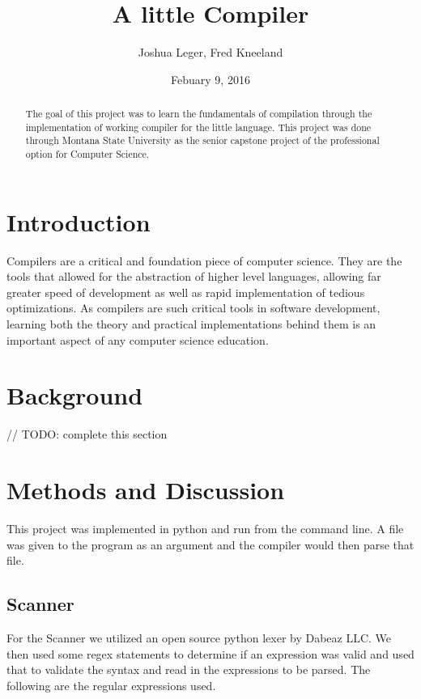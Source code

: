 \documentclass[12pt]{article}
\title{A little Compiler}
\author{Joshua Leger, Fred Kneeland}
\date{Febuary 9, 2016}
\begin{document}
    \maketitle
    \begin{abstract}
	
		The goal of this project was to learn the fundamentals of compilation through the implementation of working compiler for the little language.  This project was done through Montana State University as the senior capstone project of the professional option for Computer Science.  	
	
    \end{abstract}
    \clearpage
    \tableofcontents
    \clearpage
    
    \section{Introduction}
		Compilers are a critical and foundation piece of computer science.  They are the tools that allowed for the abstraction of higher level languages, allowing far greater speed of development as well as rapid implementation of tedious optimizations.  As compilers are such critical tools in software development, learning both the theory and practical implementations behind them is an important aspect of any computer science education.
		    
    \section{Background}
    		// TODO: complete this section
    	
    \section{Methods and Discussion}
    
    			This project was implemented in python and run from the command line.  A file was given to the program as an argument and the compiler would then parse that file.
    
    	\subsection{Scanner}
    			For the Scanner we utilized an open source python lexer by Dabeaz LLC.  We then used some regex statements to determine if an expression was valid and used that to validate the syntax and read in the expressions to be parsed. The following are the regular expressions used.
\end{document}
